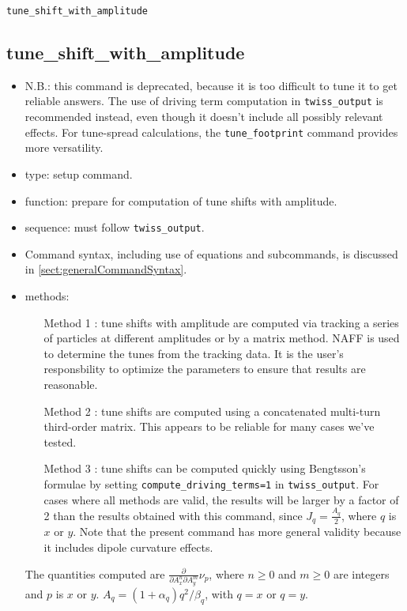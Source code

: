 \documentclass[11pt]{article}
\begin{document}
\newpage
\begin{center}{\Large\verb|tune_shift_with_amplitude|}\end{center}
\subsection{tune\_shift\_with\_amplitude \label{subsec:tuneshiftwithamplitude}}

\begin{itemize}
\item N.B.: this command is deprecated, because it is too difficult to tune it to get
  reliable answers. The use of driving term computation in \verb|twiss_output| is recommended instead, even though it 
  doesn't include all possibly relevant effects. For tune-spread calculations, the \verb|tune_footprint| command provides
  more versatility.
\item type: setup command.
\item function: prepare for computation of tune shifts with amplitude.
\item sequence: must follow \verb|twiss_output|.
\item Command syntax, including use of equations and subcommands, is discussed in \ref{sect:generalCommandSyntax}.
\item methods: 
\begin{itemize}
 \item[Method 1]: tune shifts with amplitude are computed via tracking a series of
  particles at different amplitudes or by a matrix method.  NAFF is used to 
  determine the tunes from the tracking data.  It is the user's responsbility to optimize the
  parameters to ensure that results are reasonable.  
 \item[Method 2]: tune shifts are computed using a concatenated multi-turn third-order matrix.
 This appears to be reliable for many cases we've tested.
 \item[Method 3]: tune shifts can be computed quickly using Bengtsson's formulae \cite{Bengtsson} by
 setting \verb|compute_driving_terms=1| in \verb|twiss_output|.  For cases where all methods are
 valid, the results will be larger by a factor of 2 than the results obtained with this command, 
 since $J_q = \frac{A_q}{2}$, where $q$ is $x$ or $y$.
 Note that the present command has more general validity because it includes dipole curvature effects.
\end{itemize}

The quantities computed are $\frac{\partial}{\partial A_x^n \partial A_y^m}\nu_p$, where $n\geq 0$ and $m \geq 0$ are
integers and $p$ is $x$ or $y$.  $A_q = (1 + \alpha_q) q^2/\beta_q$, with $q=x$ or $q=y$.

\end{itemize}
\end{document}
